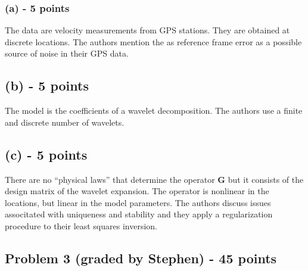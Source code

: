 \documentclass[11pt]{article}
\begin{document}
\subsubsection*{(a) - 5 points}
The data are velocity measurements from GPS stations. They are obtained at discrete locations. The authors mention the as reference frame error as a possible source of noise in their GPS data.

\subsection*{(b) - 5 points}
The model is the coefficients of a wavelet decomposition. The authors use a finite and discrete number of wavelets.

\subsection*{(c) - 5 points}
There are no ``physical laws'' that determine the operator $\mathbf{G}$ but it consists of the design matrix of the wavelet expansion. The operator is nonlinear in the locations, but linear in the model parameters. The authors discuss issues associtated with uniqueness and stability and they apply a regularization procedure to their least squares inversion.

\newpage

\subsection*{Problem 3 (graded by Stephen) - 45 points}
\end{document}
